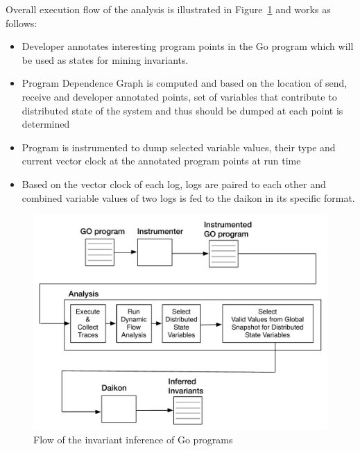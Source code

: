 Overall execution flow of the analysis is illustrated in Figure~\ref{fig:go_flow} and works as follows:
\begin{itemize}
\item Developer annotates interesting program points in the Go program which will be used as states for mining invariants.
\item Program Dependence Graph is computed and based on the location of send, receive and developer annotated points, set of variables that contribute to distributed state of the system and thus should be dumped at each point is determined
\item Program is instrumented to dump selected variable values, their type and current vector clock at the annotated program points at run time
\item Based on the vector clock of each log, logs are paired to each other and combined variable values of two logs is fed to the daikon in its specific format.
\end{itemize}


\begin{figure}
  \includegraphics[width=\columnwidth]{go_flow.pdf}
  \caption{Flow of the invariant inference of Go programs}
  \label{fig:go_flow}
\end{figure}

